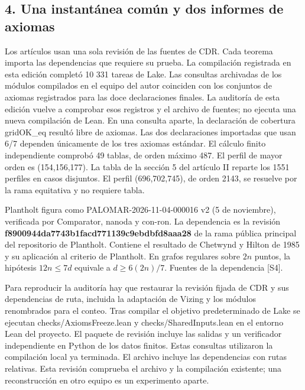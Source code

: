 \documentclass[spanish,11pt,a4paper]{article}
\begin{document}
\subsection{4. Una instantánea común y dos informes de axiomas}\label{una-instantuxe1nea-comuxfan-y-dos-informes-de-axiomas}

Los artículos usan una sola revisión de las fuentes de CDR. Cada teorema importa las dependencias que requiere su prueba. La compilación registrada en esta edición completó 10 331 tareas de Lake. Las consultas archivadas de los módulos compilados en el equipo del autor coinciden con los conjuntos de axiomas registrados para las doce declaraciones finales. La auditoría de esta edición vuelve a comprobar esos registros y el archivo de fuentes; no ejecuta una nueva compilación de Lean. En una consulta aparte, la declaración de cobertura gridOK\_eq resultó libre de axiomas. Las dos declaraciones importadas que usan 6/7 dependen únicamente de los tres axiomas estándar. El cálculo finito independiente comprobó 49 tablas, de orden máximo 487. El perfil de mayor orden es (154,156,177). La tabla de la sección 5 del artículo II reparte los 1551 perfiles en casos disjuntos. El perfil (696,702,745), de orden 2143, se resuelve por la rama equitativa y no requiere tabla.

Plantholt figura como PALOMAR-2026-11-04-000016 v2 (5 de noviembre), verificada por Comparator, nanoda y con-ron. La dependencia es la revisión \textbf{f8900944da\allowbreak{}7743b1facd\allowbreak{}771139c9eb\allowbreak{}dbfd8aaa28} de la rama pública principal del repositorio de Plantholt. Contiene el resultado de Chetwynd y Hilton de 1985 y su aplicación al criterio de Plantholt. En grafos regulares sobre \(2n\) puntos, la hipótesis \(12n\le7d\) equivale a \(d\ge6(2n)/7\). Fuentes de la dependencia {[}S4{]}.

Para reproducir la auditoría hay que restaurar la revisión fijada de CDR y sus dependencias de ruta, incluida la adaptación de Vizing y los módulos renombrados para el conteo. Tras compilar el objetivo predeterminado de Lake se ejecutan checks/AxiomsFreeze.lean y checks/SharedInputs.lean en el entorno Lean del proyecto. El paquete de revisión incluye las salidas y un verificador independiente en Python de los datos finitos. Estas consultas utilizaron la compilación local ya terminada. El archivo incluye las dependencias con rutas relativas. Esta revisión comprueba el archivo y la compilación existente; una reconstrucción en otro equipo es un experimento aparte.
\end{document}
